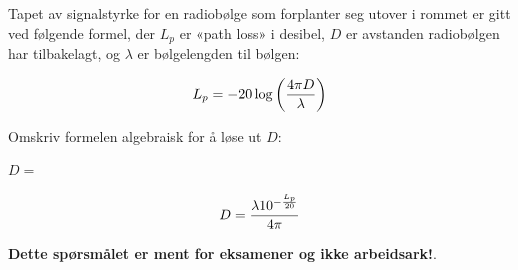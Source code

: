

Tapet av signalstyrke for en radiobølge som forplanter seg utover i rommet er gitt ved følgende formel, der $L_p$ er «path loss» i desibel, $D$ er avstanden radiobølgen har tilbakelagt, og $\lambda$ er bølgelengden til bølgen:
 
$$L_p = -20 \log \left({4 \pi D \over \lambda}\right)$$

Omskriv formelen algebraisk for å løse ut $D$:

\vskip 20pt

$D = $







$$D = {\lambda 10^{-{L_p \over 20}} \over 4 \pi}$$







{\bf Dette spørsmålet er ment for eksamener og ikke arbeidsark!}.


